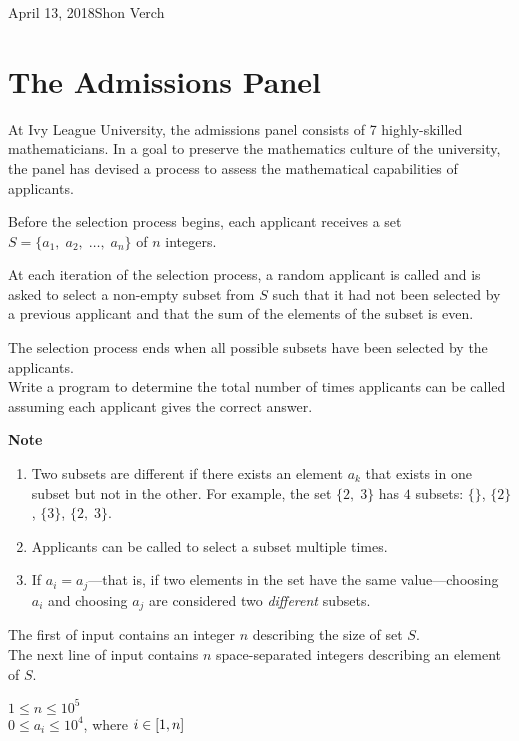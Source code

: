

             {April 13, 2018}{Shon Verch}



\section{The Admissions Panel}
At Ivy League University, the admissions panel consists of 7 highly-skilled mathematicians. In a goal to preserve the mathematics culture of the university, the panel has devised a process to assess the mathematical capabilities of applicants.

Before the selection process begins, each applicant receives a set $S = \{a_1,\;a_2,\;\ldots,\;a_n\}$ of $n $ integers. 

At each iteration of the selection process, a random applicant is called and is asked to select a non-empty subset from $S$ such that it had not been selected by a previous applicant and that the sum of the elements of the subset is even.

The selection process ends when all possible subsets have been selected by the applicants.\\

Write a program to determine the total number of times applicants can be called assuming each applicant gives the correct answer.

\noindent
\textbf{Note}
\begin{enumerate}
    \item Two subsets are different if there exists an element $a_k$ that exists in one subset but not in the other. For example, the set $\{2,\;3\}$ has $4$ subsets: $\{\}$, $\{2\}$, $\{3\}$, $\{2,\;3\}$.
    \item Applicants can be called to select a subset multiple times.
    \item If $a_i=a_j$---that is, if two elements in the set have the same value---choosing $a_i$ and choosing $a_j$ are considered two \textit{different} subsets.
\end{enumerate}

The first of input contains an integer $n$ describing the size of set $S$.\\
The next line of input contains $n$ space-separated integers describing an element of $S$.

\constraints
$1 \leq n \leq 10^5$\\
$0 \leq a_i \leq 10^4$, where $i \in \interval{1}{n}$

